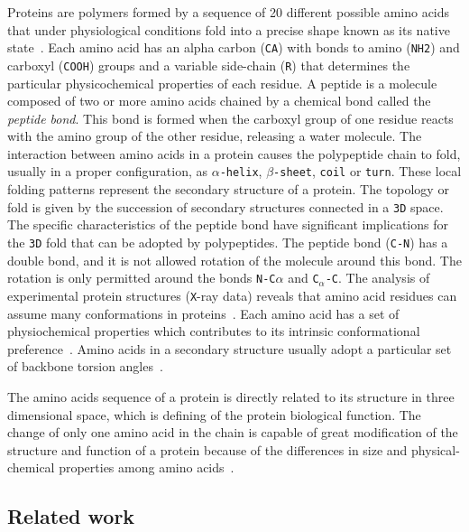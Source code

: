 \documentclass[10pt, conference]{IEEEtran}
\begin{document}
Proteins are polymers formed by a sequence of 20 different possible amino acids that under physiological conditions fold into a precise shape known as its native state~\cite{anfinsen:1973}. Each amino acid has an alpha carbon (\texttt{CA}) with bonds to amino (\texttt{NH2}) and carboxyl (\texttt{COOH}) groups and a variable side-chain (\texttt{R}) that determines the particular physicochemical properties of each residue. A peptide is a molecule composed of two or more amino acids chained by a chemical bond called the \textit{peptide bond}. This bond is formed when the carboxyl group of one residue reacts with the amino group of the other residue, releasing a water molecule. The interaction between amino acids in a protein causes the polypeptide chain to fold, usually in a proper configuration, as \texttt{$\alpha$-helix}, \texttt{$\beta$-sheet}, \texttt{coil} or \texttt{turn}. These local folding patterns represent the secondary structure of a protein. The topology or fold is given by the succession of secondary structures connected in a \texttt{3D} space. The specific characteristics of the peptide bond have significant implications for the \texttt{3D} fold that can be adopted by polypeptides. The peptide bond (\texttt{C-N}) has a double bond, and it is not allowed rotation of the molecule around this bond. The rotation is only permitted around the bonds \texttt{N-C$\alpha$} and \texttt{C}$_{\alpha}$\texttt{-C}. The analysis of experimental protein structures (\texttt{X}-ray data) reveals that amino acid residues can assume many conformations in proteins~\cite{Borguesan:2015}. Each amino acid has a set of physiochemical properties which contributes to its intrinsic conformational preference~\cite{Mathura:2005}. Amino acids in a secondary structure usually adopt a particular set of backbone torsion angles~\cite{Borguesan:2015}.

The amino acids sequence of a protein is directly related to its structure in three dimensional space, which is defining of the protein biological function. The change of only one amino acid in the chain is capable of great modification of the structure and function of a protein because of the differences in size and physical-chemical properties among amino acids~\cite{nelson2008lehninger}.

\subsection{Related work}
%


\end{document}
